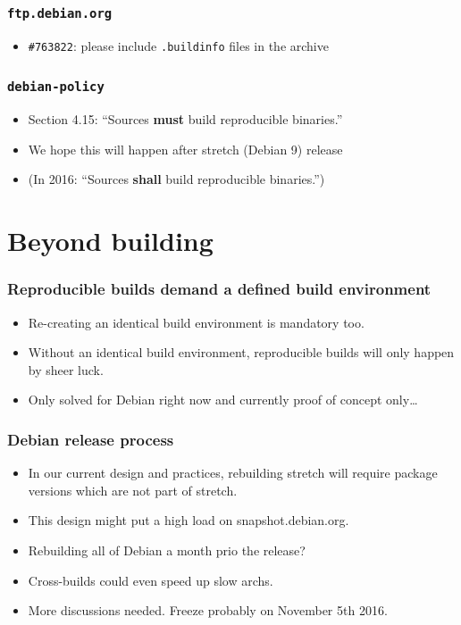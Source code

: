 \documentclass[14pt]{beamer}
\begin{document}
\begin{frame}
 \frametitle{\texttt{ftp.debian.org}}

 \begin{itemize}
  \item \texttt{\#763822}: please include \texttt{.buildinfo} files in the archive
 \end{itemize}
\end{frame}

\begin{frame}
 \frametitle{\texttt{debian-policy}}

 \begin{itemize}
  \item Section 4.15: “Sources \textbf{must} build reproducible binaries.”
  \item<2-3> We hope this will happen after stretch (Debian 9) release
  \item<3> (In 2016: “Sources \textbf{shall} build reproducible binaries.”)
 \end{itemize}
\end{frame}

\section{Beyond building}

\begin{frame}
 \frametitle{Reproducible builds demand a defined build environment}
 \begin{itemize}
  \item Re-creating an identical build environment is mandatory too.
  \item Without an identical build environment, reproducible builds will only
  happen by sheer luck.
  \item<2>{Only solved for Debian right now and currently proof of concept only…}
 \end{itemize}
\end{frame}

\begin{frame}
 \frametitle{Debian release process}
 \begin{itemize}
  \item In our current design and practices, rebuilding stretch will require
  package versions which are not part of stretch.
  \item This design might put a high load on snapshot.debian.org.
  \item<2-4>{Rebuilding all of Debian a month prio the release? }
  \item<3-4>{Cross-builds could even speed up slow archs.}
  \item<4>{More discussions needed. Freeze probably on November 5th 2016.}
 \end{itemize}
\end{frame}
\end{document}
